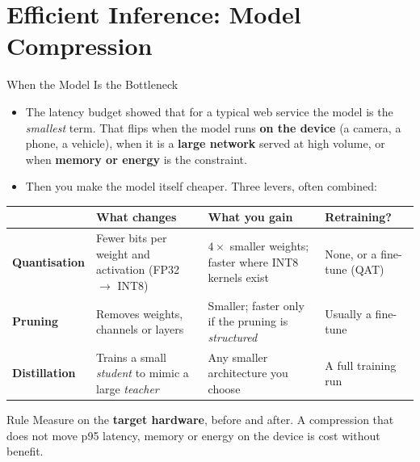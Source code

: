 \section{Efficient Inference: Model Compression}

\begin{frame}{When the Model Is the Bottleneck}

    \begin{itemize}
        \item The latency budget showed that for a typical web service the model is the \emph{smallest}
              term. That flips when the model runs \textbf{on the device} (a camera, a phone, a vehicle),
              when it is a \textbf{large network} served at high volume, or when \textbf{memory or energy}
              is the constraint.
        \item Then you make the model itself cheaper. Three levers, often combined:
    \end{itemize}

    \vspace{0.2em}
    \centering
    \renewcommand{\arraystretch}{1.3}
    {\scriptsize
    \begin{tabular}{p{2.0cm}|p{3.9cm}|p{3.3cm}|p{2.5cm}}
        \toprule
                              & \textbf{What changes} & \textbf{What you gain} & \textbf{Retraining?} \\
        \midrule
        \textbf{Quantisation} & Fewer bits per weight and activation (FP32 $\rightarrow$ INT8)
                              & $4\times$ smaller weights; faster where INT8 kernels exist
                              & None, or a fine-tune (QAT) \\
        \textbf{Pruning}      & Removes weights, channels or layers
                              & Smaller; faster only if the pruning is \emph{structured}
                              & Usually a fine-tune \\
        \textbf{Distillation} & Trains a small \emph{student} to mimic a large \emph{teacher}
                              & Any smaller architecture you choose
                              & A full training run \\
        \bottomrule
    \end{tabular}}

    \vspace{0.5em}
    \begin{block}{Rule}
        Measure on the \textbf{target hardware}, before and after. A compression that does not move p95
        latency, memory or energy on the device is cost without benefit.
    \end{block}

\end{frame}

